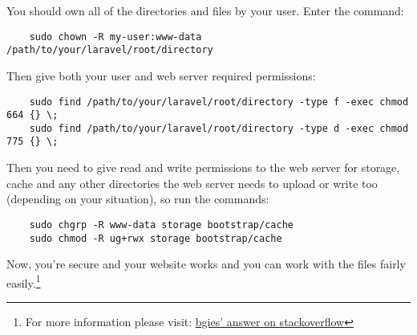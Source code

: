 \documentclass[12pt]{article}
\begin{document}
You should own all of the directories and files by your user. Enter the command:
\begin{verbatim}
    sudo chown -R my-user:www-data /path/to/your/laravel/root/directory
\end{verbatim}
Then give both your user and web server required permissions:
\begin{verbatim}
    sudo find /path/to/your/laravel/root/directory -type f -exec chmod 664 {} \;
    sudo find /path/to/your/laravel/root/directory -type d -exec chmod 775 {} \;
\end{verbatim}
Then you need to give read and write permissions to the web server for storage, cache and any other directories the web server needs to upload or write too (depending on your situation), so run the commands:
\begin{verbatim}
    sudo chgrp -R www-data storage bootstrap/cache
    sudo chmod -R ug+rwx storage bootstrap/cache
\end{verbatim}
Now, you're secure and your website works and you can work with the files fairly easily.\footnote{For more information please visit: \href{https://stackoverflow.com/a/37266353}{bgies' answer on stackoverflow}}
\end{document}
